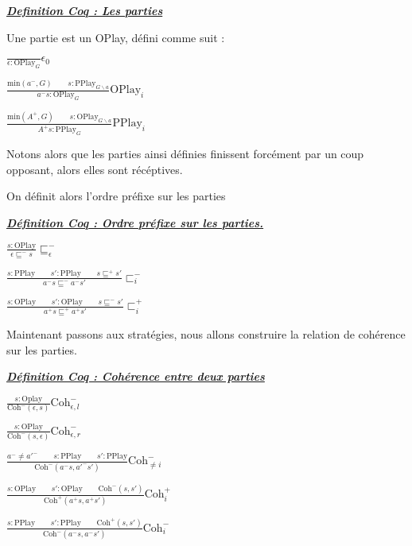 \documentclass[a4paper,12ptCOUCOU
]{article}
\newlength{\mydepth}
\newlength{\myheight}
\newenvironment{answer}
{\par\begin{lrbox}{\mybox}\quad\begin{minipage}{\linewidth}\color{black}\setlength{\parskip}{10pt plus 1pt minus 1pt}\vspace*{-.7\baselineskip}}
{\end{minipage}\end{lrbox}
\settodepth{\mydepth}{\usebox{\mybox}}
\settoheight{\myheight}{\usebox{\mybox}}
\addtolength{\myheight}{\mydepth}
\noindent\makebox[0pt]{
  \color{gray}\hspace{-0pt}\rule[-\mydepth]{1pt}{\myheight}}
\usebox{\mybox}
  }
\begin{document}
\vspace{0.4cm}\begin{minipage}{\linewidth}\textbf{\textit{\underline{ Definition Coq : Les parties }}} \begin{answer}
Une partie est un OPlay, défini comme suit :

$\frac{}{\epsilon : \text{OPlay}_G}\epsilon_0$

$\frac{\text{min}(a^-,G) \qquad s : \text{PPlay}_{G\backslash a}}
{a^-s : \text{OPlay}_G}\text{OPlay}_i$

$\frac{\text{min}(A^+,G) \qquad s : \text{OPlay}_{G\backslash a}}
{A^+s : \text{PPlay}_G}\text{PPlay}_i$
\end{answer}\end{minipage}

Notons alors que les parties ainsi définies finissent forcément par un coup
opposant, alors elles sont récéptives.


On définit alors l'ordre préfixe sur les parties

\vspace{0.4cm}\begin{minipage}{\linewidth}\textbf{\textit{\underline{ Définition Coq : Ordre préfixe sur les parties. }}} \begin{answer}
$\frac{s : \text{OPlay}}{\epsilon \sqsubseteq^- s} \sqsubseteq^-_\epsilon$

$\frac{s : \text{PPlay} \qquad s' : \text{PPlay} \qquad s \sqsubseteq^+ s'}
{a^-s \sqsubseteq^- a^-s'} \sqsubset^-_i$

$\frac{s : \text{OPlay} \qquad s' : \text{OPlay} \qquad s \sqsubseteq^- s'}
{a^+s \sqsubseteq^+ a^+s'} \sqsubset^+_i$
\end{answer}\end{minipage}


Maintenant passons aux stratégies, nous allons construire la relation de
cohérence sur les parties.

\vspace{0.4cm}\begin{minipage}{\linewidth}\textbf{\textit{\underline{ Définition Coq : Cohérence entre deux parties }}} \begin{answer}

$\frac{s:\text{Oplay}}{\text{Coh}^-(\epsilon,s)} \text{Coh}^-_{\epsilon,l}$

$\frac{s:\text{OPlay}}{\text{Coh}^-(s,\epsilon)} \text{Coh}^-_{\epsilon,r}$

$\frac{a^- \neq a'^- \qquad s:\text{PPlay} \qquad s':\text{PPlay}}
{\text{Coh}^-(a^-s, a'^- s')} \text{Coh}^-_{\neq i}$

$\frac{s : \text{OPlay} \qquad s':\text{OPlay} \qquad \text{Coh}^-(s,s')}
{\text{Coh}^+(a^+s, a^+s')} \text{Coh}^+_i$

$\frac{s : \text{PPlay} \qquad s':\text{PPlay} \qquad \text{Coh}^+(s,s')}
{\text{Coh}^-(a^-s, a^-s')} \text{Coh}^-_i$

\end{answer}\end{minipage}
\end{document}
